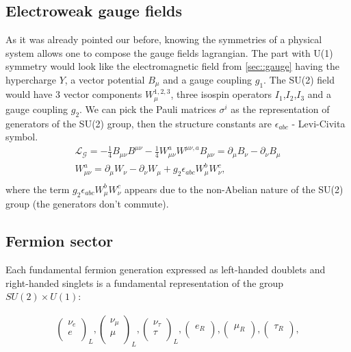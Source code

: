 \subsection{Electroweak gauge fields}
As it was already pointed our before, knowing the symmetries of a physical system allows one to compose the gauge fields lagrangian. The part with U(1) symmetry would look like the electromagnetic field from \ref{sec::gauge} having the hypercharge $Y$, a vector potential $B_{\mu}$ and a gauge coupling $g_1$. The SU(2) field would have 3 vector components $W^{1,2,3}_{\mu}$, three isospin operators $I_1$,$I_2$,$I_3$ and a gauge coupling $g_2$. We can pick the Pauli matrices $\sigma^{i}$ as the representation of generators of the SU(2) group, then the structure constants are $\epsilon_{abc}$ - Levi-Civita symbol.
\begin{equation}
\begin{array}{lcl} 
\mathcal{L_{G}} =  -\frac{1}{4}B_{\mu \nu}B^{\mu \nu} -\frac{1}{4}W^a_{\mu \nu}W^{\mu \nu,a} 
B_{\mu \nu}  =\partial_{\mu}B_{\nu} - \partial_{\nu}B_{\mu}\\ 
W^a_{\mu \nu}  =\partial_{\mu}W_{\nu} - \partial_{\nu}W_{\mu}+g_2\epsilon_{abc}W^b_{\mu}W^c_{\nu},\\ 
\end{array} 
\end{equation}
where the term $g_2\epsilon_{abc}W^b_{\mu}W^c_{\nu}$ appears due to the non-Abelian nature of the SU(2) group (the generators don't commute).


\subsection{Fermion sector}
Each fundamental fermion generation expressed as left-handed doublets and right-handed singlets is a fundamental representation of the group $SU(2)\times U(1)$:

\begin{align}
\begin{pmatrix}
\nu_e  \\
e \\
\end{pmatrix}_L,
\begin{pmatrix}
\nu_{\mu}  \\
\mu \\
\end{pmatrix}_L,
\begin{pmatrix}
\nu_{\tau}  \\
\tau \\
\end{pmatrix}_L,
\begin{pmatrix}
e_R \\
\end{pmatrix},
\begin{pmatrix}
\mu_R \\
\end{pmatrix},
\begin{pmatrix}
\tau_R \\
\end{pmatrix},
\end{align}

